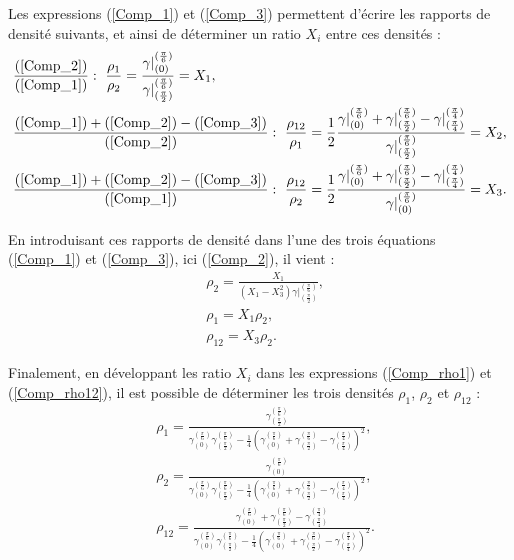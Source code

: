 \documentclass[twoside,openright]{report}
\begin{document}
    Les expressions (\ref{Comp_1}) et (\ref{Comp_3}) permettent d'écrire les rapports de densité suivants, et ainsi de déterminer un ratio $X_i$ entre ces densités :
    \begin{align}
    &\frac{(\ref{Comp_2})}{(\ref{Comp_1})} :\ \frac{\rho_1}{\rho_2}=\frac{\gamma|^{(\frac{\pi}{6})}_{(0)}}{\gamma|^{(\frac{\pi}{6})}_{(\frac{\pi}{2})}}=X_1,\label{Comp_rho2_rho1} \\
    &\frac{(\ref{Comp_1})+(\ref{Comp_2})-(\ref{Comp_3})}{(\ref{Comp_2})} :\ \frac{\rho_{12}}{\rho_1}=\frac{1}{2}\frac{\gamma|^{(\frac{\pi}{6})}_{(0)}+\gamma|^{(\frac{\pi}{6})}_{(\frac{\pi}{2})}-\gamma|^{(\frac{\pi}{4})}_{(\frac{\pi}{4})}}{\gamma|^{(\frac{\pi}{6})}_{(\frac{\pi}{2})}}=X_2,\label{Comp_rho12_rho1} \\
    &\frac{(\ref{Comp_1})+(\ref{Comp_2})-(\ref{Comp_3})}{(\ref{Comp_1})} :\ \frac{\rho_{12}}{\rho_2}=\frac{1}{2}\frac{\gamma|^{(\frac{\pi}{6})}_{(0)}+\gamma|^{(\frac{\pi}{6})}_{(\frac{\pi}{2})}-\gamma|^{(\frac{\pi}{4})}_{(\frac{\pi}{4})}}{\gamma|^{(\frac{\pi}{6})}_{(0)}}=X_3.\label{Comp_rho12_rho2}
    \end{align}
    
    En introduisant ces rapports de densité dans l'une des trois équations (\ref{Comp_1}) et (\ref{Comp_3}), ici (\ref{Comp_2}), il vient : 
    \begin{align}
    &\rho_2=\frac{X_1}{(X_1-X_3^2)\gamma|^{(\frac{\pi}{6})}_{(\frac{\pi}{2})}},\label{Comp_rho2}\\
    &\rho_1=X_1\rho_2,\label{Comp_rho1}\\
    &\rho_{12}=X_3\rho_2.\label{Comp_rho12}
    \end{align}
    
    Finalement, en développant les ratio $X_i$ dans les expressions (\ref{Comp_rho1}) et (\ref{Comp_rho12}), il est possible de déterminer les trois densités $\rho_1$, $\rho_2$ et $\rho_{12}$ :
    \begin{align}
        &\rho_1=\frac{\gamma^{(\frac{\pi}{6})}_{(\frac{\pi}{2})}}{\gamma^{(\frac{\pi}{6})}_{(0)}\gamma^{(\frac{\pi}{6})}_{(\frac{\pi}{2})}-\frac{1}{4}(\gamma^{(\frac{\pi}{6})}_{(0)}+\gamma^{(\frac{\pi}{6})}_{(\frac{\pi}{2})}-\gamma^{(\frac{\pi}{4})}_{(\frac{\pi}{4})})^2},\label{rho1}\\
        &\rho_2=\frac{\gamma^{(\frac{\pi}{6})}_{(0)}}{\gamma^{(\frac{\pi}{6})}_{(0)}\gamma^{(\frac{\pi}{6})}_{(\frac{\pi}{2})}-\frac{1}{4}(\gamma^{(\frac{\pi}{6})}_{(0)}+\gamma^{(\frac{\pi}{6})}_{(\frac{\pi}{2})}-\gamma^{(\frac{\pi}{4})}_{(\frac{\pi}{4})})^2},\label{rho2}\\
        &\rho_{12}=\frac{\gamma^{(\frac{\pi}{6})}_{(0)}+\gamma^{(\frac{\pi}{6})}_{(\frac{\pi}{2})}-\gamma^{(\frac{\pi}{4})}_{(\frac{\pi}{4})}}{\gamma^{(\frac{\pi}{6})}_{(0)}\gamma^{(\frac{\pi}{6})}_{(\frac{\pi}{2})}-\frac{1}{4}(\gamma^{(\frac{\pi}{6})}_{(0)}+\gamma^{(\frac{\pi}{6})}_{(\frac{\pi}{2})}-\gamma^{(\frac{\pi}{4})}_{(\frac{\pi}{4})})^2}.\label{rho12}
    \end{align}
\end{document}
